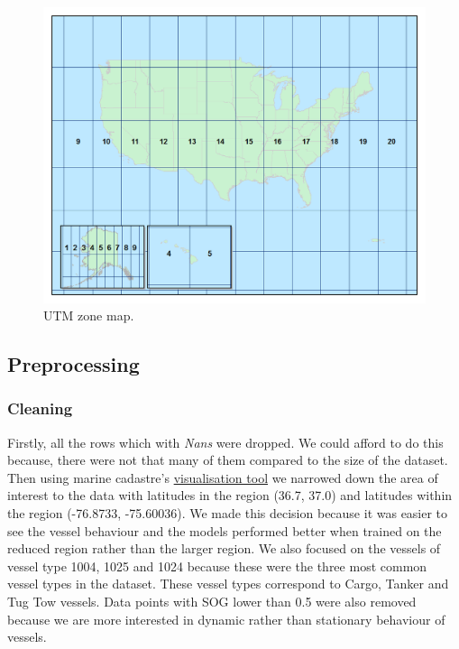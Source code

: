\documentclass[bsc,frontabs,twoside,singlespacing,parskip,deptreport]{infthesis}     %
\begin{document}
\begin{figure}
    \centering
    \includegraphics[width=0.8\linewidth]{report/images/UTMZoneMap2014.png}
    \caption{UTM zone map.}
    \label{fig:utm}
\end{figure}

\subsection{Preprocessing}

\subsubsection{Cleaning}
\label{sss:cleaning}
Firstly, all the rows which with \emph{Nans} were dropped. We could afford to do this because, there were not that many of them compared to the size of the dataset. Then using marine cadastre's \href{}{visualisation tool} we narrowed down the area of interest to the data with latitudes in the region (36.7, 37.0) and latitudes within the region (-76.8733, -75.60036). We made this decision because it was easier to see the vessel behaviour and the models performed better when trained on the reduced region rather than the larger region. We also focused on the vessels of vessel type 1004, 1025 and 1024 because these were the three most common vessel types in the dataset. These vessel types correspond to Cargo, Tanker and Tug Tow vessels. Data points with SOG lower than 0.5 were also removed because we are more interested in dynamic rather than stationary behaviour of vessels.
\end{document}
